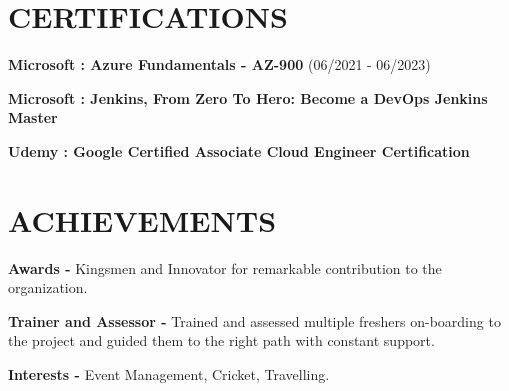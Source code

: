 \documentclass[letterpaper,11pt]{article}
\begin{document}
\section{CERTIFICATIONS}
 \begin{itemize}[leftmargin=0.3in]
   \setlength{\itemsep}{1pt}
   \setlength{\parskip}{0pt}
   \setlength{\parsep}{0pt}
    \small{\item{
    \textbf{Microsoft : Azure Fundamentals - AZ-900} {(06/2021 - 06/2023)}\vspace{2pt} \\}
    \item{\textbf{Microsoft : Jenkins, From Zero To Hero: Become a DevOps Jenkins Master} \vspace{2pt} \\}
    \item{\textbf{Udemy : Google Certified Associate Cloud Engineer Certification}\vspace{2pt} \\
    }
    }
 \end{itemize}
 
\section{ACHIEVEMENTS}
 \begin{itemize}[leftmargin=0.3in]
  \setlength{\itemsep}{1pt}
  \setlength{\parskip}{0pt}
  \setlength{\parsep}{0pt}
    \small{\item{
    \textbf{Awards -} {Kingsmen and Innovator for remarkable contribution to the organization.} \vspace{0pt} \\}
    \item{\textbf{Trainer and Assessor -} {Trained and assessed multiple freshers on-boarding to the project and guided them to the right path with constant support.} \vspace{0pt} \\}
    \item{\textbf{Interests -} {Event Management, Cricket, Travelling.} \vspace{0pt} \\
    }
    }
 \end{itemize}
\end{document}
